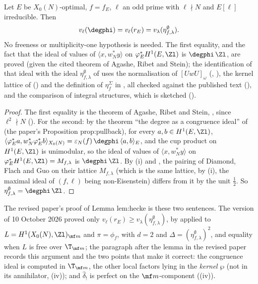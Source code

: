 \begin{theorem}\label{thm:congruence:lem-hecke}
Let $E$ be $X_0(N)$-optimal, $f=f_E$, $\ell$ an odd prime with $\ell\nmid N$ and $E[\ell]$ irreducible. Then
\[
v_\ell(\degphi)=v_\ell(r_E)=v_\lambda(\eta^\emptyset_{f,\lambda}).
\]
No freeness or multiplicity-one hypothesis is needed. The first equality, and the fact that the ideal of values of $\langle x,w_N^*y\rangle$ on $\varphi_E^*H^1(E,\Zl)$ is
$\degphi\,\Zl$, are proved (given the cited theorem of Agashe, Ribet and Stein); the identification of that ideal with the ideal $\eta^\emptyset_{f,\lambda}$ of \cite{DFG04} uses the normalisation of $[UwU]_\omega$ (, ), the kernel lattice of
\cite[Sections 1.1.2, 1.6.2]{DFG04} () and the definition of $\eta^\Sigma_f$ in \cite[Section 1.7.3]{DFG04}, all checked against the published text
(), and the comparison of integral structures, which is sketched ().
\end{theorem}

\begin{proof}
The first equality is the theorem of Agashe, Ribet and Stein, \cite[Theorem 2.2]{ARS12}, since $\ell^2\nmid N$ (). For the second: by the theorem ``the degree as a
congruence ideal'' of  (the paper's Proposition prop:pullback), for every $a,b\in H^1(E,\Zl)$,
$\langle\varphi_E^*a,w_N^*\varphi_E^*b\rangle_{X_0(N)}=\varepsilon_N(f)\,\degphi\,\langle a,b\rangle_E$, and the cup product on $H^1(E,\Zl)$ is unimodular, so the ideal of values of $\langle x,w_N^*y\rangle$ on
$\varphi_E^*H^1(E,\Zl)=M_{f,\lambda}$ is $\degphi\,\Zl$. By (i) and , the pairing of Diamond, Flach and Guo on their
lattice $M_{f,\lambda}$ (which is the same lattice, by (i), the maximal ideal of $(f,\ell)$ being non-Eisenstein) differs from it by the unit $\frac12$. So
$\eta^\emptyset_{f,\lambda}=\degphi\,\Zl$.
\end{proof}

\begin{paperlink}
The revised paper's proof of Lemma lem:hecke is these two sentences. The version of 10 October 2026 proved only $v_\ell(r_E)\ge v_\lambda(\eta^\emptyset_{f,\lambda})$, by  applied
to $L=H^1(X_0(N),\Zl)_{\mf m}$ and $\pi=\phi_f$, with $d=2$ and $\Delta=(\eta^\emptyset_{f,\lambda})^2$, and equality when $L$ is free over $\T_{\mf m}$; the paragraph after the lemma in the revised paper
records this argument and the two points that make it correct: the congruence ideal is computed in $\T_{\mf m}$, the other local factors lying in the \emph{kernel} $\wp$ (not in its
annihilator, (iv)); and $\hat\delta_!$ is perfect on the $\mf m$-component ((iv)).
\end{paperlink}

